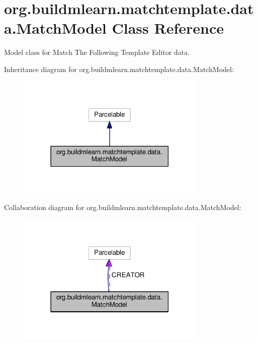 \hypertarget{classorg_1_1buildmlearn_1_1matchtemplate_1_1data_1_1MatchModel}{}\section{org.\+buildmlearn.\+matchtemplate.\+data.\+Match\+Model Class Reference}
\label{classorg_1_1buildmlearn_1_1matchtemplate_1_1data_1_1MatchModel}


Model class for Match The Following Template Editor data.  




Inheritance diagram for org.\+buildmlearn.\+matchtemplate.\+data.\+Match\+Model\+:
\nopagebreak
\begin{figure}[H]
\begin{center}
\leavevmode
\includegraphics[width=255pt]{classorg_1_1buildmlearn_1_1matchtemplate_1_1data_1_1MatchModel__inherit__graph}
\end{center}
\end{figure}


Collaboration diagram for org.\+buildmlearn.\+matchtemplate.\+data.\+Match\+Model\+:
\nopagebreak
\begin{figure}[H]
\begin{center}
\leavevmode
\includegraphics[width=255pt]{classorg_1_1buildmlearn_1_1matchtemplate_1_1data_1_1MatchModel__coll__graph}
\end{center}
\end{figure}
